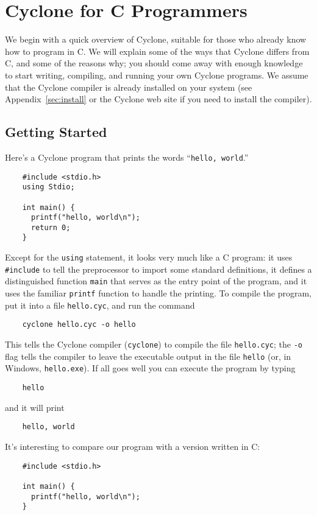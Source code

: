 \section{Cyclone for C Programmers}

We begin with a quick overview of Cyclone, suitable for those who
already know how to program in C\@.  We will explain some of the ways
that Cyclone differs from C, and some of the reasons why; you should
come away with enough knowledge to start writing, compiling, and
running your own Cyclone programs.  We assume that the Cyclone
compiler is already installed on your system (see
Appendix~\ref{sec:install} or the Cyclone web site if you need to
install the compiler).

\subsection{Getting Started}

Here's a Cyclone program that prints the words ``\texttt{hello,
  world}.''
\begin{verbatim}
    #include <stdio.h>
    using Stdio;

    int main() {
      printf("hello, world\n");
      return 0;
    }
\end{verbatim}  

Except for the \texttt{using} statement, it looks very much like a C
program: it uses \texttt{\#include} to tell the preprocessor to import
some standard definitions, it defines a distinguished function
\texttt{main} that serves as the entry point of the program, and it
uses the familiar \texttt{printf} function to handle the printing.  To
compile the program, put it into a file \texttt{hello.cyc}, and run
the command
\begin{verbatim}
    cyclone hello.cyc -o hello
\end{verbatim}
This tells the Cyclone compiler (\texttt{cyclone}) to compile the file
\texttt{hello.cyc}; the \texttt{-o} flag tells the compiler to leave
the executable output in the file \texttt{hello} (or, in Windows,
\texttt{hello.exe}).  If all goes well you can execute the program by
typing
\begin{verbatim}
    hello
\end{verbatim}
and it will print
\begin{verbatim}
    hello, world
\end{verbatim}

It's interesting to compare our program with a version written in C:
\begin{verbatim}
    #include <stdio.h>

    int main() {
      printf("hello, world\n");
    }
\end{verbatim}

